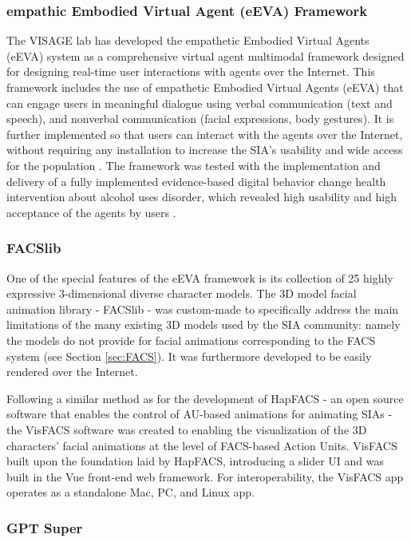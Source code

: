 \documentclass[12pt]{article}
\begin{document}
\subsubsection{empathic Embodied Virtual Agent (eEVA) Framework}
The VISAGE lab has developed the empathetic Embodied Virtual Agents (eEVA) system as 
 a comprehensive virtual agent multimodal framework designed for designing real-time user interactions with agents over the Internet. This framework includes the use of empathetic Embodied Virtual Agents (eEVA) that can engage users in meaningful dialogue using verbal communication (text and speech), and nonverbal communication (facial expressions, body gestures).  It is further implemented so that users can interact with the agents over the Internet, without requiring any installation to increase the SIA's usability and wide access for the population  \cite{PolceanuTimeCONCEPTS}.  The framework was tested with the implementation and delivery of a fully implemented evidence-based digital behavior change health intervention about alcohol uses disorder, which revealed high usability and high acceptance of the agents by users \cite{Amini2021a}\cite{Amini2015}.

\subsubsection{FACSlib}
\label{sec:facslib}

One of the special features of the eEVA framework is its collection of 25 highly expressive 3-dimensional diverse character models.  The 3D model facial animation library - FACSlib - was custom-made to specifically address the  main limitations of the many existing 3D models used by the SIA community: namely the models do not provide for facial animations corresponding to the FACS system (see Section \ref{sec:FACS}).  It was furthermore developed to be easily rendered over the Internet.

Following a similar method as for the development of HapFACS - an open source  software that enables the control of AU-based animations for animating SIAs \cite{Amini2015} - the VisFACS software was created to enabling the visualization of the 3D characters' facial animations at the level of FACS-based Action Units. 
VisFACS built upon the foundation laid by HapFACS, introducing a slider UI and was built in the Vue front-end web framework. For interoperability, the VisFACS app operates as a standalone Mac, PC, and Linux app.

\subsubsection{GPT Super}
\end{document}
